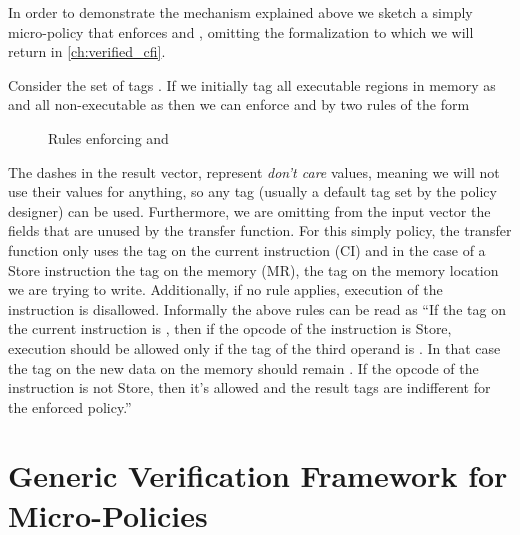 
In order to demonstrate the mechanism explained above we sketch a
simply micro-policy that enforces \NWC and \NXD, omitting the
formalization to which we will return in \cref{ch:verified_cfi}.

Consider the set of tags \TAGS{\DATA,\INSTRname}. If we initially tag
all executable regions in memory as \INSTRname and all non-executable
as \DATAname then we can enforce \NWC and \NXD by two rules of the form

\begin{figure}[htb!]
\bigskip

\bigskip

\caption{Rules enforcing \NWC and \NXD}
\end{figure}

The dashes in the result vector, represent \textit{don't care} values,
meaning we will not use their values for anything, so any tag (usually
a default tag set by the policy designer) can be used. Furthermore, we
are omitting from the input vector the fields that are unused by the
transfer function. For this simply policy, the transfer function only
uses the tag on the current instruction (CI) and in the case of a
Store instruction the tag on the memory (MR), \IE the tag on the
memory location we are trying to write. Additionally, if no rule
applies, execution of the instruction is disallowed. Informally the
above rules can be read as ``If the tag on the current instruction is
\INSTRname, then if the opcode of the instruction is Store, execution
should be allowed only if the tag of the third operand is \DATA. In
that case the tag on the new data on the memory should remain
\DATA. If the opcode of the instruction is not Store, then it's
allowed and the result tags are indifferent for the enforced policy.''

\section{Generic Verification Framework for Micro-Policies}
\label{sec:framework}

